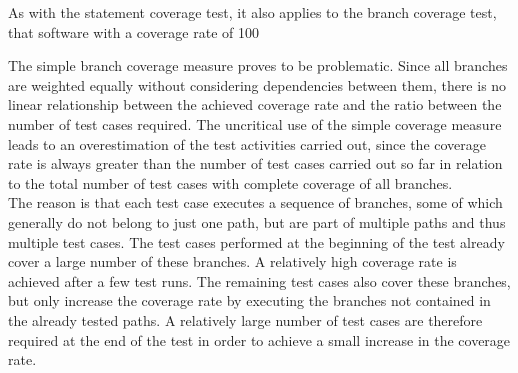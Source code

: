 	As with the statement coverage test, it also applies to the branch coverage test, that software with a coverage rate of 100%

	The simple branch coverage measure proves to be problematic. Since all branches are weighted equally without considering dependencies between them, there is no linear relationship between the achieved coverage rate and the ratio between the number of test cases required. The uncritical use of the simple coverage measure leads to an overestimation of the test activities carried out, since the coverage rate is always greater than the number of test cases carried out so far in relation to the total number of test cases with complete coverage of all branches. \\

	The reason is that each test case executes a sequence of branches, some of which generally do not belong to just one path, but are part of multiple paths and thus multiple test cases. The test cases performed at the beginning of the test already cover a large number of these branches. A relatively high coverage rate is achieved after a few test runs. The remaining test cases also cover these branches, but only increase the coverage rate by executing the branches not contained in the already tested paths. A relatively large number of test cases are therefore required at the end of the test in order to achieve a small increase in the coverage rate. \\

